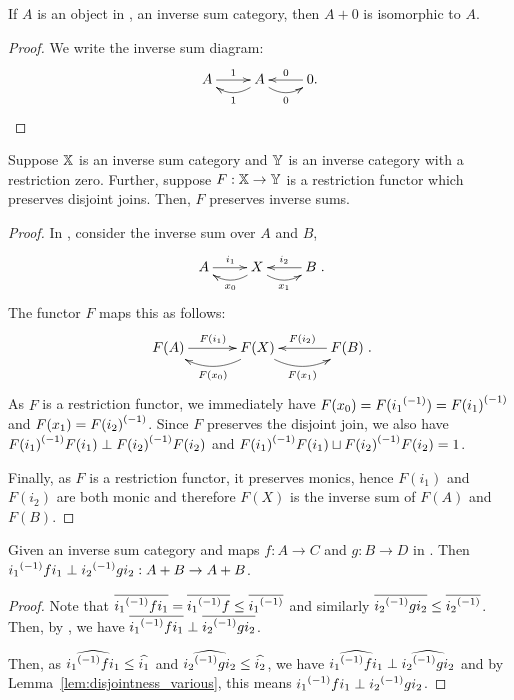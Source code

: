 \begin{lemma}\label{lem:inverse_sums_have_identity_zero}
  If $A$ is an object in \X, an inverse sum category, then $A+0$ is isomorphic to $A$.
\end{lemma}
\begin{proof}
  We write the inverse sum diagram:
  \[
    \xymatrix{
      A\ar[r]^{1} &A\ar@/^9pt/[l]^{1} \ar@/_9pt/[r]_{0} & 0 \ar[l]_{0}.
    }
  \]
\end{proof}
\begin{lemma}\label{lem:functor_preserving_joins_preserves_inverse_sums}
  Suppose $\mathbb{X}$ is an inverse sum category and $\mathbb{Y}$ is an inverse category with a restriction zero.
  Further, suppose $F:\mathbb{X} \to \mathbb{Y}$ is a restriction functor which preserves disjoint joins. Then,
  $F$ preserves inverse sums.
\end{lemma}
\begin{proof}
  In \X, consider the inverse sum over $A$ and $B$,
  \[
    \xymatrix{
      A\ar[r]^{i_1} &X\ar@/^9pt/[l]^{x_0} \ar@/_9pt/[r]_{x_1} & B \ar[l]_{i_2}
    }.
  \]
  The functor $F$ maps this as follows:
  \[
    \xymatrix@R+10pt@C+10pt{
      F(A)\ar[r]^{F(i_1)} &F(X)\ar@/^13pt/[l]^{F(x_0)} \ar@/_13pt/[r]_{F(x_1)} & F(B)\ar[l]_{F(i_2)}
    }.
  \]
  As $F$ is a restriction functor, we immediately have $F(x_0) = F({i_1}^{(-1)}) = {F(i_1)}^{(-1)}$ and
  $F(x_1) = {F(i_2)}^{(-1)}$. Since $F$ preserves the disjoint join, we also have
  ${F(i_1)}^{(-1)}F(i_1) \perp{F(i_2)}^{(-1)}F(i_2)$ and
  ${F(i_1)}^{(-1)}F(i_1) \sqcup {F(i_2)}^{(-1)}F(i_2) = 1$.

  Finally, as $F$ is a restriction functor, it preserves monics, hence $F(i_1)$ and $F(i_2)$ are
  both monic and therefore $F(X)$ is the inverse sum of $F(A)$ and $F(B)$.

\end{proof}
\begin{lemma}\label{lem:inverse_sum_maps_are_perp}
  Given \X an inverse sum category and maps $f:A \to C$ and $g:B\to D$ in \X. Then
  ${i_1}^{(-1)} f i_1 \perp {i_2}^{(-1)} g i_2 : {{A}+{B}}\to {{A}+{B}}$.
\end{lemma}
\begin{proof}
  Note that $\overline{{i_1}^{(-1)} f i_1} = \overline{{i_1}^{(-1)} f} \le \overline{{i_1}^{(-1)}}$ and similarly
  $\overline{{i_2}^{(-1)} g i_2} \le \overline{{i_2}^{(-1)}}$. Then, by , we have
  $\overline{{i_1}^{(-1)} f i_1} \perp \overline{{i_2}^{(-1)} g i_2}$.

  Then, as $\widehat{{i_1}^{(-1)} f i_1} \le \widehat{i_1}$ and  $\widehat{{i_2}^{(-1)} g i_2} \le \widehat{i_2}$, we
  have $\widehat{{i_1}^{(-1)} f i_1} \perp \widehat{{i_2}^{(-1)} g i_2}$ and by
  Lemma~\ref{lem:disjointness_various}, this means  ${i_1}^{(-1)} f i_1\perp {i_2}^{(-1)} g i_2$.
\end{proof}


